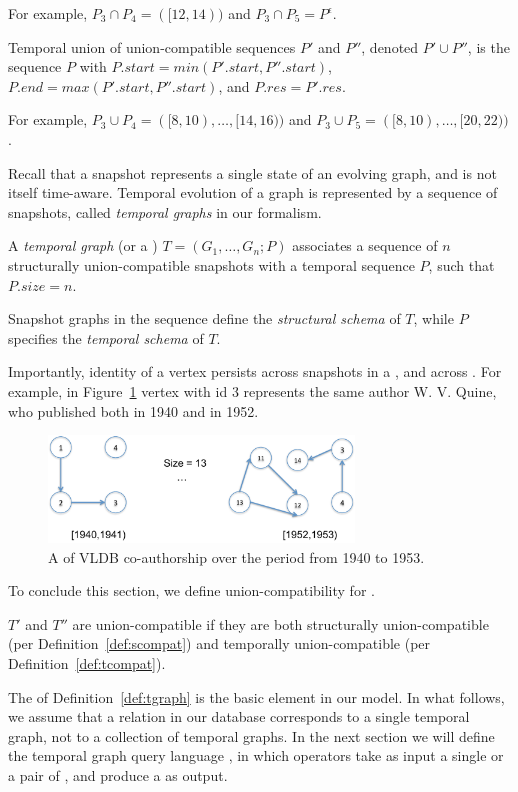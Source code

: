 For example, $P_3 \cap P_4 = ([12,14))$ and $P_3 \cap P_5 =
  P^{\epsilon}$.

\begin{definition} 
\label{def:tseqor}
Temporal union of union-compatible sequences $P'$ and $P''$, denoted
$P' \cup P''$, is the sequence $P$ with $P.start = min(P'.start,
P''.start)$, $P.end = max(P'.start, P''.start)$, and $P.res = P'.res$.
\end{definition}

For example, $P_3 \cup P_4 = ([8,10),\ldots,[14,16))$ and
$P_3 \cup P_5 = ([8,10), \ldots, [20,22))$.

Recall that a snapshot represents a single state of an evolving graph,
and is not itself time-aware.  Temporal evolution of a graph is
represented by a sequence of snapshots, called {\em temporal graphs}
in our formalism.

\begin{definition} [TGraph]
\label{def:tgraph} 
A {\em temporal graph} (or a {\em \tg}) $T = (G_1, \ldots, G_n; P)$
  associates a sequence of $n$ structurally union-compatible snapshots
  with a temporal sequence $P$, such that $P.size = n$.
\end{definition}

Snapshot graphs in the sequence define the {\em structural schema} of
$T$, while $P$ specifies the {\em temporal schema} of $T$.

Importantly, identity of a vertex persists across snapshots in a
\tg, and across \tgs.  For example, in Figure~\ref{fig:tgraph}
vertex with id 3 represents the same author W. V. Quine, who published
both in 1940 and in 1952.

\begin{figure}
\label{fig:tgraph}
\includegraphics[width=3.2in]{figs/temporalgraph.pdf}
\caption{A \tg of VLDB co-authorship over the period from 1940 to 1953.}
\end{figure}

To conclude this section, we define union-compatibility for \tgs.

\begin{definition} 
\label{def:tuc} 
$T'$ and $T''$ are union-compatible \tgs if they are both structurally
union-compatible (per Definition~\ref{def:scompat}) and temporally
union-compatible (per Definition~\ref{def:tcompat}).
\end{definition}

The \tg of Definition~\ref{def:tgraph} is the basic element in our
model.  In what follows, we assume that a relation in our database
corresponds to a single temporal graph, not to a collection of
temporal graphs.  In the next section we will define the temporal
graph query language \ql, in which operators take as input a single
\tg or a pair of \tgs, and produce a \tg as output.




